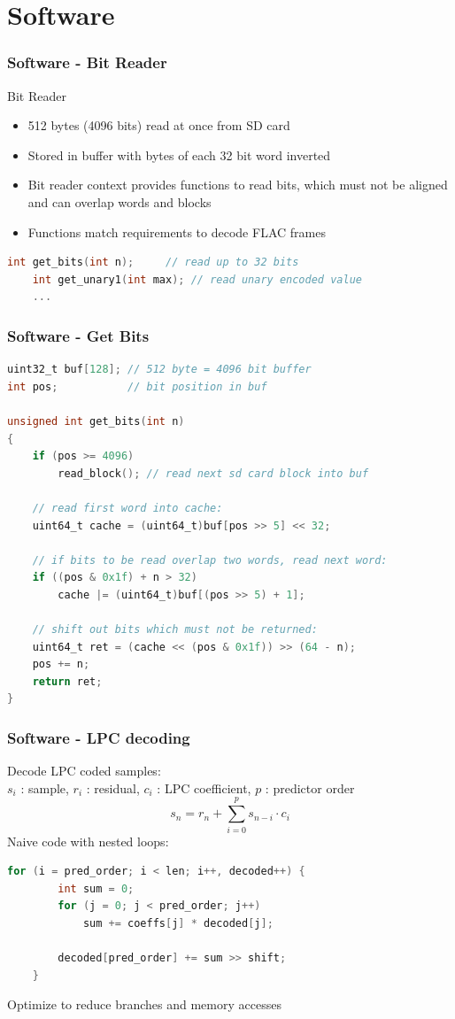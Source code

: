 \documentclass{beamer}
\begin{document}
\section{Software}
\begin{frame}[fragile]\frametitle{Software - Bit Reader}
    Bit Reader
    \begin{itemize}
    \item 512 bytes (4096 bits) read at once from SD card
    \item Stored in buffer with bytes of each 32 bit word inverted
    \item Bit reader context provides functions to read bits, which must
    not be aligned and can overlap words and blocks
    \item Functions match requirements to decode FLAC frames
    \end{itemize}
    \begin{lstlisting}[language=C]
    int get_bits(int n);     // read up to 32 bits
    int get_unary1(int max); // read unary encoded value
    ...
    \end{lstlisting}
\end{frame}
\begin{frame}[fragile]\frametitle{Software - Get Bits}
    \begin{lstlisting}[language=C]
uint32_t buf[128]; // 512 byte = 4096 bit buffer
int pos;           // bit position in buf

unsigned int get_bits(int n)
{
    if (pos >= 4096)
        read_block(); // read next sd card block into buf

    // read first word into cache:
    uint64_t cache = (uint64_t)buf[pos >> 5] << 32;

    // if bits to be read overlap two words, read next word:
    if ((pos & 0x1f) + n > 32)
        cache |= (uint64_t)buf[(pos >> 5) + 1];

    // shift out bits which must not be returned:
    uint64_t ret = (cache << (pos & 0x1f)) >> (64 - n);
    pos += n;
    return ret;
}
    \end{lstlisting}
\end{frame}
\begin{frame}[fragile]\frametitle{Software - LPC decoding}
    Decode LPC coded samples:\\
    $s_i$ : sample, $r_i$ : residual, $c_i$ : LPC coefficient, $p$ : predictor order
    $$ s_n = r_n + \sum_{i=0}^p s_{n-i} \cdot c_i $$
    Naive code with nested loops:
    \begin{lstlisting}[language=C]
    for (i = pred_order; i < len; i++, decoded++) {
        int sum = 0;
        for (j = 0; j < pred_order; j++)
            sum += coeffs[j] * decoded[j];

        decoded[pred_order] += sum >> shift;
    }
    \end{lstlisting}
    Optimize to reduce branches and memory accesses
\end{frame}
\end{document}
